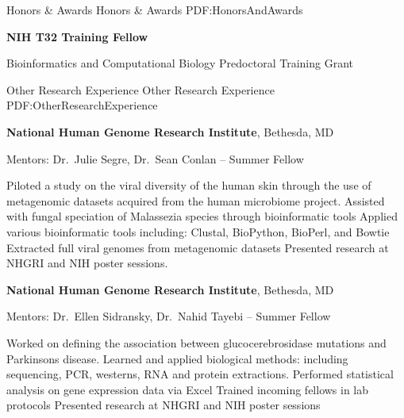 \documentclass[letterpaper,MMMyyyy,nonstopmode]{simpleresumecv}
\begin{document}
\begin{Body}
\Section
{Honors \&\newline
Awards}
{Honors \& Awards}
{PDF:HonorsAndAwards}

\BulletItem
\textbf{NIH T32 Training Fellow}
\hfill
{}
\begin{Detail}
\Item
Bioinformatics and Computational Biology Predoctoral Training Grant
\end{Detail}




\Section
{Other Research\newline
Experience}
{Other Research Experience}
{PDF:OtherResearchExperience}

\Entry
{\textbf{National Human Genome Research Institute}},
Bethesda, MD

\Gap
\BulletItem
Mentors: Dr.~Julie Segre, Dr.~Sean Conlan
\hfill
{}--
\newline
Summer Fellow
\begin{Detail}
\SubBulletItem
Piloted a study on the viral diversity of the human skin through the use of metagenomic datasets acquired from the human microbiome project.
\SubBulletItem
Assisted with fungal speciation of Malassezia species through bioinformatic tools
\SubBulletItem
Applied various bioinformatic tools including: Clustal, BioPython, BioPerl, and Bowtie
\SubBulletItem
Extracted full viral genomes from metagenomic datasets
\SubBulletItem
Presented research at NHGRI and NIH poster sessions.

\end{Detail}

\Entry
{\textbf{National Human Genome Research Institute}},
Bethesda, MD

\Gap
\BulletItem
Mentors: Dr.~Ellen Sidransky, Dr.~Nahid Tayebi
\hfill
{}--
\newline
Summer Fellow
\begin{Detail}
\SubBulletItem
Worked on defining the association between glucocerebrosidase mutations and Parkinsons disease.
\SubBulletItem
Learned and applied biological methods: including sequencing, PCR, westerns, RNA and protein extractions.
\SubBulletItem
Performed statistical analysis on gene expression data via Excel
\SubBulletItem
Trained incoming fellows in lab protocols
\SubBulletItem
Presented research at NHGRI and NIH poster sessions
\end{Detail}



\end{Body}
\end{document}
